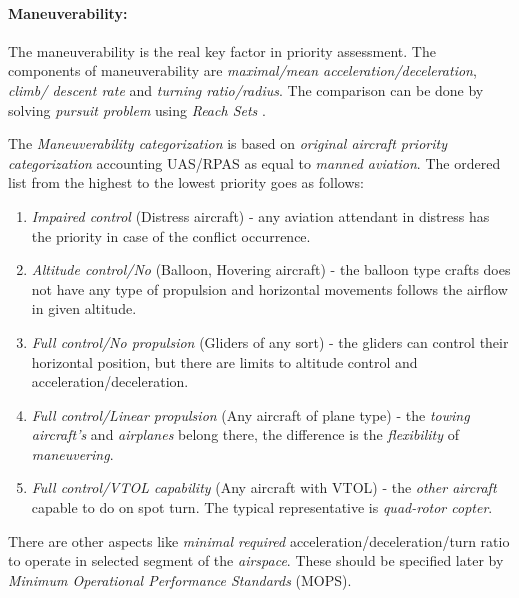 \paragraph{Maneuverability:} The maneuverability is the real key factor in priority assessment.  The components of maneuverability are \emph{maximal/mean acceleration/deceleration}, \emph{climb/ descent rate} and \emph{turning ratio/radius}. The comparison can be done by solving \emph{pursuit problem} using \emph{Reach Sets} \cite{game1987,game1988}.

\noindent The \emph{Maneuverability categorization} is based on \emph{original aircraft priority categorization} \cite{icaoAnnex2} accounting UAS/RPAS as equal to \emph{manned aviation}. The ordered list from the highest to the lowest priority goes as follows:

\begin{enumerate}
    \item \emph{Impaired control} (Distress aircraft) - any aviation attendant in distress has the priority in case of the conflict occurrence.
    
    \item \emph{Altitude control/No} (Balloon, Hovering aircraft) - the balloon type crafts does not have any type of propulsion and horizontal movements follows the airflow in given altitude. 
    
    
    \item \emph{Full control/No propulsion} (Gliders of any sort) - the gliders can control their horizontal position, but there are limits to altitude control and acceleration/deceleration. 
    
    \item \emph{Full control/Linear propulsion} (Any aircraft of plane type) - the \emph{towing aircraft's} and \emph{airplanes} belong there, the difference is the \emph{flexibility} of \emph{maneuvering}.
    
    \item \emph{Full control/VTOL capability} (Any aircraft with VTOL) - the \emph{other aircraft} capable to do on spot turn. The typical representative is \emph{quad-rotor copter}.
\end{enumerate}

There are other aspects like \emph{minimal required} acceleration/deceleration/turn ratio to operate in selected segment of the \emph{airspace}. These should be specified later by \emph{Minimum Operational Performance Standards} (MOPS).

